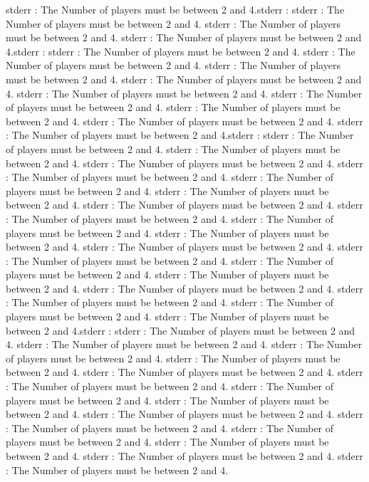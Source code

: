 stderr  : The Number of players must be between 2 and 4.stderr  : 
stderr  : The Number of players must be between 2 and 4.
stderr  : The Number of players must be between 2 and 4.
stderr  : The Number of players must be between 2 and 4.stderr  : 
stderr  : The Number of players must be between 2 and 4.
stderr  : The Number of players must be between 2 and 4.
stderr  : The Number of players must be between 2 and 4.
stderr  : The Number of players must be between 2 and 4.
stderr  : The Number of players must be between 2 and 4.
stderr  : The Number of players must be between 2 and 4.
stderr  : The Number of players must be between 2 and 4.
stderr  : The Number of players must be between 2 and 4.
stderr  : The Number of players must be between 2 and 4.stderr  : 
stderr  : The Number of players must be between 2 and 4.
stderr  : The Number of players must be between 2 and 4.
stderr  : The Number of players must be between 2 and 4.
stderr  : The Number of players must be between 2 and 4.
stderr  : The Number of players must be between 2 and 4.
stderr  : The Number of players must be between 2 and 4.
stderr  : The Number of players must be between 2 and 4.
stderr  : The Number of players must be between 2 and 4.
stderr  : The Number of players must be between 2 and 4.
stderr  : The Number of players must be between 2 and 4.
stderr  : The Number of players must be between 2 and 4.
stderr  : The Number of players must be between 2 and 4.
stderr  : The Number of players must be between 2 and 4.
stderr  : The Number of players must be between 2 and 4.
stderr  : The Number of players must be between 2 and 4.
stderr  : The Number of players must be between 2 and 4.
stderr  : The Number of players must be between 2 and 4.
stderr  : The Number of players must be between 2 and 4.stderr  : 
stderr  : The Number of players must be between 2 and 4.
stderr  : The Number of players must be between 2 and 4.
stderr  : The Number of players must be between 2 and 4.
stderr  : The Number of players must be between 2 and 4.
stderr  : The Number of players must be between 2 and 4.
stderr  : The Number of players must be between 2 and 4.
stderr  : The Number of players must be between 2 and 4.
stderr  : The Number of players must be between 2 and 4.
stderr  : The Number of players must be between 2 and 4.
stderr  : The Number of players must be between 2 and 4.
stderr  : The Number of players must be between 2 and 4.
stderr  : The Number of players must be between 2 and 4.
stderr  : The Number of players must be between 2 and 4.
stderr  : The Number of players must be between 2 and 4.
